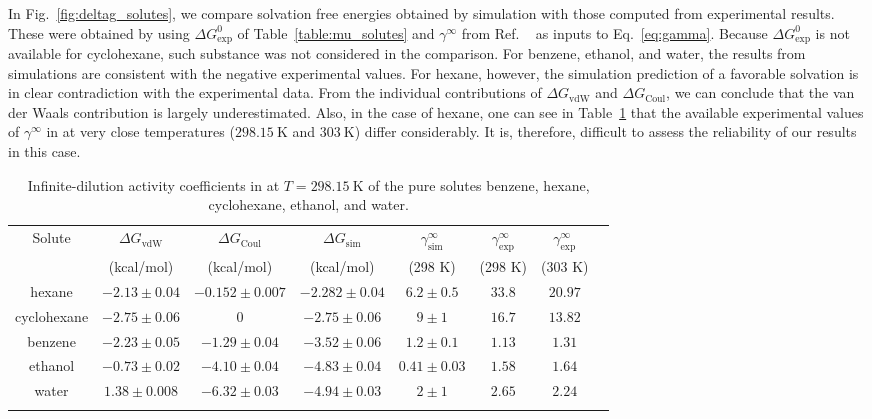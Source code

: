 \documentclass[3p,twocolumn]{elsarticle}
\begin{document}
In Fig.~\ref{fig:deltag_solutes}, we compare solvation free energies obtained by simulation with those computed from experimental results.
These were obtained by using $\Delta G^{0}_\text{exp}$ of Table~\ref{table:mu_solutes} and $\gamma^\infty$ from Ref. ~ as inputs to Eq.~\eqref{eq:gamma}.
Because $\Delta G^{0}_\text{exp}$ is not available for cyclohexane, such substance was not considered in the comparison.
For benzene, ethanol, and water, the results from simulations are consistent with the negative experimental values. For hexane, however, the simulation prediction of a favorable solvation is in clear contradiction with the experimental data.
From the individual contributions of $\Delta G_\text{vdW}$ and $\Delta G_\text{Coul}$, we can conclude that the van der Waals contribution is largely underestimated.
Also, in the case of hexane, one can see in Table~\ref{table:gamma} that the available experimental values of $\gamma^\infty$ in \ce{[emim][B(CN)_4]} at very close temperatures ($298.15~\text{K}$ and $303~\text{K}$) differ considerably.
It is, therefore, difficult to assess the reliability of our results in this case.

\begin{table}
	\centering
	\caption{Infinite-dilution activity coefficients in \ce{[emim][B(CN)_4]} at $T = 298.15~\text{K}$ of the pure solutes benzene, hexane, cyclohexane, ethanol, and water.}
	\begin{adjustbox}{width=1\textwidth}
		\begin{tabular}{cccccccc}  
			\hline\hline
			Solute & $\Delta G_\text{vdW}$  & $\Delta G_\text{Coul}$  & $\Delta G_\text{sim}$  & $\gamma^\infty_\text{sim}$ & $\gamma^\infty_\text{exp}$ \cite{Doma_ska_2011} & $\gamma^\infty_\text{exp}$ \cite{Yan_2010} \\
			& (kcal/mol) & (kcal/mol) &  (kcal/mol)  & (298 K) & (298 K)  & (303 K) \\
			\hline
			hexane & $-2.13 \pm 0.04$ & $-0.152 \pm 0.007$ & $-2.282 \pm 0.04$ & $6.2 \pm 0.5$ & $33.8$ & $20.97$  \\
			cyclohexane & $-2.75 \pm 0.06$ & 0 & $-2.75 \pm 0.06$ & $9 \pm 1$ & $16.7$ & $13.82$ \\
			benzene & $-2.23 \pm 0.05$ & $-1.29 \pm 0.04$ & $-3.52 \pm 0.06$ & $1.2 \pm 0.1$ & $1.13$ & $1.31$ \\ 
			ethanol & $-0.73 \pm 0.02$ & $-4.10 \pm 0.04$ & $-4.83 \pm 0.04$ & $0.41 \pm 0.03$ & $1.58$ & $1.64$  \\
			water & $1.38 \pm 0.008$ & $-6.32 \pm 0.03$ & $-4.94 \pm 0.03$ & $2 \pm 1$ & $2.65$ & $2.24$ \\
			\hline\hline
			\label{table:gamma} 
		\end{tabular}
	\end{adjustbox}
\end{table}
\end{document}
